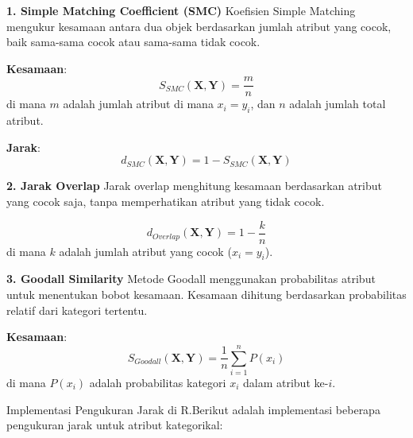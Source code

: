 \documentclass[
  oneside]{book}
\begin{document}
\textbf{1. Simple Matching Coefficient (SMC)} Koefisien Simple Matching mengukur kesamaan antara dua objek berdasarkan jumlah atribut yang cocok, baik sama-sama cocok atau sama-sama tidak cocok.

\textbf{Kesamaan}: \[
S_{SMC}(\mathbf{X}, \mathbf{Y}) = \frac{m}{n}
\] di mana \(m\) adalah jumlah atribut di mana \(x_i = y_i\), dan \(n\) adalah jumlah total atribut.

\textbf{Jarak}: \[
d_{SMC}(\mathbf{X}, \mathbf{Y}) = 1 - S_{SMC}(\mathbf{X}, \mathbf{Y})
\]

\textbf{2. Jarak Overlap} Jarak overlap menghitung kesamaan berdasarkan atribut yang cocok saja, tanpa memperhatikan atribut yang tidak cocok.

\[
d_{Overlap}(\mathbf{X}, \mathbf{Y}) = 1 - \frac{k}{n}
\] di mana \(k\) adalah jumlah atribut yang cocok (\(x_i = y_i\)).

\textbf{3. Goodall Similarity} Metode Goodall menggunakan probabilitas atribut untuk menentukan bobot kesamaan. Kesamaan dihitung berdasarkan probabilitas relatif dari kategori tertentu.

\textbf{Kesamaan}: \[
S_{Goodall}(\mathbf{X}, \mathbf{Y}) = \frac{1}{n} \sum_{i=1}^n P(x_i)
\] di mana \(P(x_i)\) adalah probabilitas kategori \(x_i\) dalam atribut ke-\(i\).

Implementasi Pengukuran Jarak di R.Berikut adalah implementasi beberapa pengukuran jarak untuk atribut kategorikal:
\end{document}
